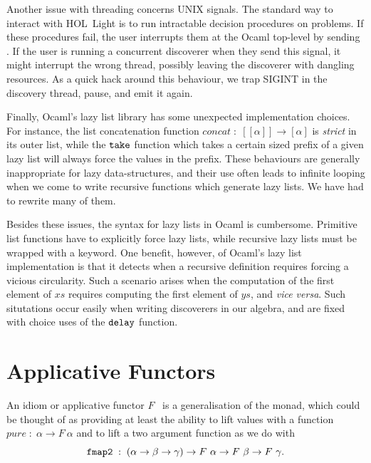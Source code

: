 
Another issue with threading concerns UNIX signals. The standard way to interact with HOL~Light is to run intractable decision procedures on problems. If these procedures fail, the user interrupts them at the Ocaml top-level by sending . If the user is running a concurrent discoverer when they send this signal, it might interrupt the wrong thread, possibly leaving the discoverer with dangling resources. As a quick hack around this behaviour, we trap SIGINT in the discovery thread, pause, and emit it again.

Finally, Ocaml's lazy list library has some unexpected implementation choices. For instance, the list concatenation function $concat\;:\;[[\alpha]]\rightarrow[\alpha]$ is \emph{strict} in its outer list, while the $\texttt{take}$ function which takes a certain sized prefix of a given lazy list will always force the values in the prefix. These behaviours are generally inappropriate for lazy data-structures, and their use often leads to infinite looping when we come to write recursive functions which generate lazy lists. We have had to rewrite many of them.

Besides these issues, the syntax for lazy lists in Ocaml is cumbersome. Primitive list functions have to explicitly force lazy lists, while recursive lazy lists must be wrapped with a  keyword. One benefit, however, of Ocaml's lazy list implementation is that it detects when a recursive definition requires forcing a vicious circularity. Such a scenario arises when the computation of the first element of $xs$ requires computing the first element of $ys$, and \emph{vice versa}. Such situtations occur easily when writing discoverers in our algebra, and are fixed with choice uses of the $\texttt{delay}$ function.

\section{Applicative Functors}\label{sec:Applicative}
An idiom or applicative functor $F$~\cite{Applicative} is a generalisation of the monad, which could be thought of as providing at least the ability to lift values with a function $pure\;:\;\alpha \rightarrow F\ \alpha$ and to lift a two argument function as we do with 
\begin{displaymath}
\texttt{fmap2}\;:\;(\alpha\rightarrow\beta\rightarrow\gamma)\rightarrow F\ \alpha \rightarrow F\ \beta \rightarrow F\ \gamma.
\end{displaymath}

